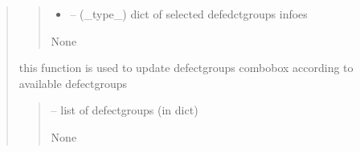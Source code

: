 \documentclass[letterpaper,10pt,english]{sphinxmanual}
\begin{document}
\begin{quote}
\begin{savenotes}
\begin{fulllineitems}
\begin{quote}
\begin{description}
\begin{itemize}
\item {} 
\sphinxAtStartPar
{} – (\_type\_) dict of selected defedct\sphinxhyphen{}groups infoes

\end{itemize}

\sphinxAtStartPar
None

\end{description}\end{quote}

\end{fulllineitems}\end{savenotes}


\begin{savenotes}\begin{fulllineitems}
\label{\detokenize{setting/backend/defect_management_funcs:oxin.backend.defect_management_funcs.set_defect_groups_on_combo}}
\pysigstartsignatures
{}
\pysigstopsignatures
\sphinxAtStartPar
this function is used to update defect\sphinxhyphen{}groups combobox according to available defect\sphinxhyphen{}groups
\begin{quote}\begin{description}
\sphinxAtStartPar
{} – list of defect\sphinxhyphen{}groups (in dict)

\sphinxAtStartPar
None

\end{description}\end{quote}

\end{fulllineitems}\end{savenotes}



\end{quote}
\end{document}
